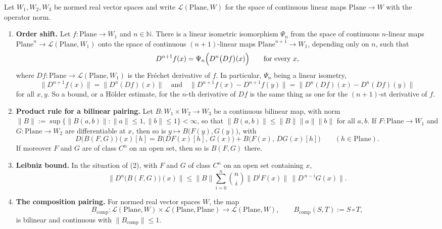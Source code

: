 \begin{proposition}
Let $W_1,W_2,W_3$ be normed real vector spaces and write $\mathcal{L}(\mathrm{Plane},W)$ for the
space of continuous linear maps $\mathrm{Plane}\to W$ with the operator norm.
\begin{enumerate}
\item \textbf{Order shift.}  Let $f\colon\mathrm{Plane}\to W_1$ and $n\in\mathbb{N}$.  There is a
linear isometric isomorphism $\Psi_n$ from the space of continuous $n$-linear maps
$\mathrm{Plane}^{n}\to\mathcal{L}(\mathrm{Plane},W_1)$ onto the space of continuous
$(n+1)$-linear maps $\mathrm{Plane}^{n+1}\to W_1$, depending only on $n$, such that
\[
  D^{n+1}f(x)=\Psi_n\Bigl(D^{n}\bigl(Df\bigr)(x)\Bigr)\qquad\text{for every }x,
\]
where $Df\colon\mathrm{Plane}\to\mathcal{L}(\mathrm{Plane},W_1)$ is the Fr\'echet derivative of
$f$.  In particular, $\Psi_n$ being a linear isometry,
\[
  \bigl\lVert D^{n+1}f(x)\bigr\rVert=\bigl\lVert D^{n}(Df)(x)\bigr\rVert
  \quad\text{and}\quad
  \bigl\lVert D^{n+1}f(x)-D^{n+1}f(y)\bigr\rVert
    =\bigl\lVert D^{n}(Df)(x)-D^{n}(Df)(y)\bigr\rVert
\]
for all $x,y$.  So a bound, or a H\"older estimate, for the $n$-th derivative of $Df$ is the
same thing as one for the $(n+1)$-st derivative of $f$.
\item \textbf{Product rule for a bilinear pairing.}  Let
$B\colon W_1\times W_2\to W_3$ be a continuous bilinear map, with norm
$\lVert B\rVert:=\sup\{\lVert B(a,b)\rVert:\lVert a\rVert\le1,\lVert b\rVert\le1\}<\infty$, so
that $\lVert B(a,b)\rVert\le\lVert B\rVert\lVert a\rVert\lVert b\rVert$ for all $a,b$.  If
$F\colon\mathrm{Plane}\to W_1$ and $G\colon\mathrm{Plane}\to W_2$ are differentiable at $x$,
then so is $y\mapsto B\bigl(F(y),G(y)\bigr)$, with
\[
  D\bigl(B(F,G)\bigr)(x)[h]=B\bigl(DF(x)[h],\,G(x)\bigr)+B\bigl(F(x),\,DG(x)[h]\bigr)
  \qquad(h\in\mathrm{Plane}).
\]
If moreover $F$ and $G$ are of class $C^{n}$ on an open set, then so is $B(F,G)$ there.
\item \textbf{Leibniz bound.}  In the situation of (2), with $F$ and $G$ of class $C^{n}$ on an
open set containing $x$,
\[
  \bigl\lVert D^{n}\bigl(B(F,G)\bigr)(x)\bigr\rVert
  \le\lVert B\rVert\sum_{i=0}^{n}\binom{n}{i}
      \bigl\lVert D^{i}F(x)\bigr\rVert\,\bigl\lVert D^{\,n-i}G(x)\bigr\rVert .
\]
\item \textbf{The composition pairing.}  For normed real vector spaces $W$, the map
\[
  B_{\mathrm{comp}}\colon\mathcal{L}(\mathrm{Plane},W)\times\mathcal{L}(\mathrm{Plane},\mathrm{Plane})
  \longrightarrow\mathcal{L}(\mathrm{Plane},W),\qquad
  B_{\mathrm{comp}}(S,T):=S\circ T,
\]
is bilinear and continuous with $\lVert B_{\mathrm{comp}}\rVert\le1$.
\end{enumerate}
\end{proposition}

